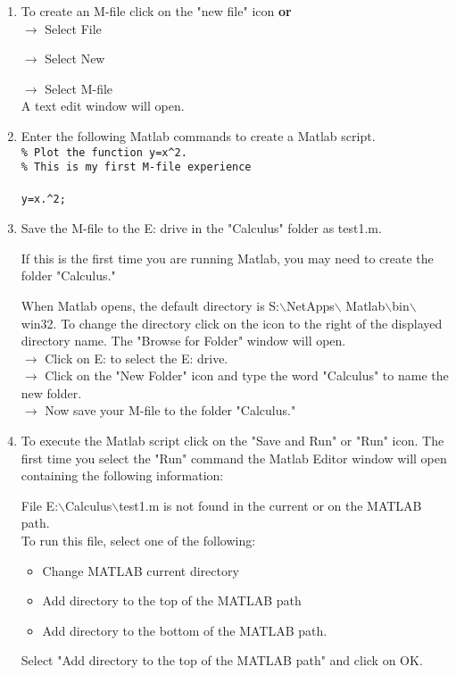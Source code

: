 \begin{enumerate}
  \item To create an M-file click on the "new file" icon \textbf{or}\\
  $\rightarrow$ Select File
  
  \hspace{.2in}$\rightarrow$  Select New 
  
  \hspace{.4in}$\rightarrow$  Select M-file\\
  A text edit window will open.
  
  \item Enter the following Matlab commands to create a Matlab script.\\
  \verb!% Plot the function y=x^2.!\\
  \verb!% This is my first M-file experience!\\
  \\
  \verb!y=x.^2;!\\
  
  \item Save the M-file to the E: drive in the "Calculus" folder as test1.m.
  
  If this is the first time you are running Matlab, you may need to create the
  folder "Calculus."
  
  When Matlab opens, the default directory is S:$\backslash$NetApps$\backslash$ 
  Matlab$\backslash$bin$\backslash$win32.  To change the directory click on the
  icon to the right of the displayed directory name.  The "Browse for Folder"
  window will open.\\
  $\rightarrow$ Click on E: to select the E: drive.\\
  $\rightarrow$ Click on the "New Folder" icon and type the word "Calculus" to
  name the new folder.\\
  $\rightarrow$ Now save your M-file to the folder "Calculus."
  
  \item To execute the Matlab script click on the "Save and Run" or "Run" icon. 
  The first time you select the "Run" command the Matlab Editor window will open
  containing the following information:
  
  File E:$\backslash$Calculus$\backslash$test1.m is not found in the current
  or on the MATLAB path.\\ 
  To run this file, select one of the following:
  \begin{itemize}
    \item Change MATLAB current directory
    \item Add directory to the top of the MATLAB path
    \item Add directory to the bottom of the MATLAB path.
  \end{itemize}
  Select "Add directory to the top of the MATLAB path" and click on OK.
  

\end{enumerate}
